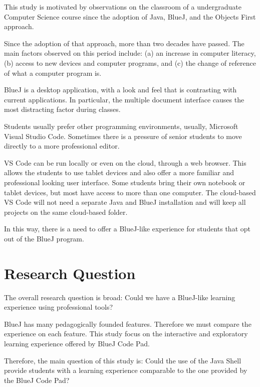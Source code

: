 \documentclass{article}
\begin{document}
This study is motivated by observations on the classroom of a undergraduate Computer Science course since the adoption of Java, BlueJ, and the Objects First approach.

Since the adoption of that approach, more than two decades have passed. The main factors observed on this period include: (a) an increase in computer literacy, (b) access to new devices and computer programs, and (c) the change of reference of what a computer program is.

BlueJ is a desktop application, with a look and feel that is contrasting with current applications. In particular, the multiple document interface causes the most distracting factor during classes.

Students usually prefer other programming environments, usually, Microsoft Visual Studio Code. Sometimes there is a pressure of senior students to move directly to a more professional editor. 


VS Code can be run locally or even on the cloud, through a web browser. This allows the students to use tablet devices and also offer a more familiar and professional looking user interface. Some students bring their own notebook or tablet devices, but most have access to more than one computer. The cloud-based VS Code will not need a separate Java and BlueJ installation and will keep all projects on the same cloud-based folder.

In this way, there is a need to offer a BlueJ-like experience for students that opt out of the BlueJ program. 

\section{Research Question}

The overall research question is broad: Could we have a BlueJ-like learning experience using professional tools?

BlueJ has many pedagogically founded features. Therefore we must compare the experience on each feature. This study focus on the interactive and exploratory learning experience offered by BlueJ Code Pad.

Therefore, the main question of this study is:
Could the use of the Java Shell provide students with a learning experience comparable to the one provided by the BlueJ Code Pad?
\end{document}
